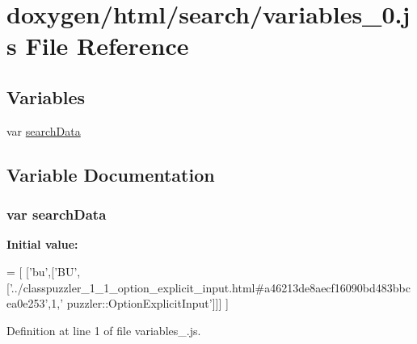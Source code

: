 \hypertarget{a00104}{}\section{doxygen/html/search/variables\+\_\+0.js File Reference}
\label{a00104}
\subsection*{Variables}
\begin{DoxyCompactItemize}
\item 
var \hyperlink{a00104_ad01a7523f103d6242ef9b0451861231e}{search\+Data}
\end{DoxyCompactItemize}


\subsection{Variable Documentation}
\hypertarget{a00104_ad01a7523f103d6242ef9b0451861231e}{}
\subsubsection[{search\+Data}]{\setlength{\rightskip}{0pt plus 5cm}var search\+Data}\label{a00104_ad01a7523f103d6242ef9b0451861231e}
{\bfseries Initial value\+:}
\begin{DoxyCode}
=
[
  [\textcolor{stringliteral}{'bu'},[\textcolor{stringliteral}{'BU'},[\textcolor{stringliteral}{'../classpuzzler\_1\_1\_option\_explicit\_input.html#a46213de8aecf16090bd483bbcea0e253'},1,\textcolor{stringliteral}{'
      puzzler::OptionExplicitInput'}]]]
]
\end{DoxyCode}


Definition at line 1 of file variables\+\_.\+js.

